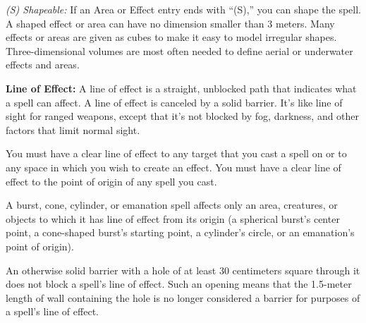 \textit{(S) Shapeable:} If an Area or Effect entry ends with ``(S),'' you can shape the spell. A shaped effect or area can have no dimension smaller than 3 meters. Many effects or areas are given as cubes to make it easy to model irregular shapes. Three-dimensional volumes are most often needed to define aerial or underwater effects and areas.

\textbf{Line of Effect:} A line of effect is a straight, unblocked path that indicates what a spell can affect. A line of effect is canceled by a solid barrier. It's like line of sight for ranged weapons, except that it's not blocked by fog, darkness, and other factors that limit normal sight.

You must have a clear line of effect to any target that you cast a spell on or to any space in which you wish to create an effect. You must have a clear line of effect to the point of origin of any spell you cast.

A burst, cone, cylinder, or emanation spell affects only an area, creatures, or objects to which it has line of effect from its origin (a spherical burst's center point, a cone-shaped burst's starting point, a cylinder's circle, or an emanation's point of origin).

An otherwise solid barrier with a hole of at least 30 centimeters square through it does not block a spell's line of effect. Such an opening means that the 1.5-meter length of wall containing the hole is no longer considered a barrier for purposes of a spell's line of effect.